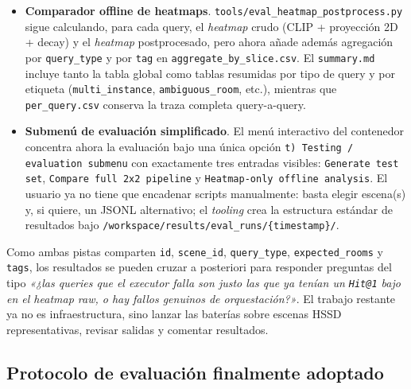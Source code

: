 \documentclass[11pt,a4paper]{article}
\begin{document}
\begin{itemize}
        Early~Stop~Rate, Final~Room~Accuracy, Preview~No~Action~Rate,
        Path~Stopped~Early~Rate, Mean~Executor~Actions y
        Mean~Room~Transitions. Para ello, tanto baseline como executor
        emiten al final de cada query un marcador estructurado
        \texttt{[eval-summary] \{...\}} con historial de habitaciones,
        candidatos intentados/confirmados y rastro de acciones.
  \item \textbf{Comparador offline de heatmaps}.
        \texttt{tools/eval\_heatmap\_postprocess.py} sigue calculando,
        para cada query, el \emph{heatmap} crudo (CLIP + proyección 2D +
        decay) y el \emph{heatmap} postprocesado, pero ahora añade además
        agregación por \texttt{query\_type} y por \texttt{tag} en
        \texttt{aggregate\_by\_slice.csv}. El \texttt{summary.md}
        incluye tanto la tabla global como tablas resumidas por tipo de
        query y por etiqueta (\texttt{multi\_instance},
        \texttt{ambiguous\_room}, etc.), mientras que \texttt{per\_query.csv}
        conserva la traza completa query-a-query.
  \item \textbf{Submenú de evaluación simplificado}.
        El menú interactivo del contenedor concentra ahora la evaluación
        bajo una única opción \texttt{t) Testing / evaluation submenu} con
        exactamente tres entradas visibles:
        \texttt{Generate test set},
        \texttt{Compare full 2x2 pipeline} y
        \texttt{Heatmap-only offline analysis}. El usuario ya no tiene que
        encadenar scripts manualmente: basta elegir escena(s) y, si
        quiere, un JSONL alternativo; el \emph{tooling} crea la estructura
        estándar de resultados bajo
        \texttt{/workspace/results/eval\_runs/\{timestamp\}/}.
\end{itemize}
Como ambas pistas comparten \texttt{id}, \texttt{scene\_id},
\texttt{query\_type}, \texttt{expected\_rooms} y \texttt{tags}, los resultados
se pueden cruzar a posteriori para responder preguntas del tipo \emph{«¿las
queries que el executor falla son justo las que ya tenían un
\texttt{Hit@1} bajo en el heatmap raw, o hay fallos genuinos de
orquestación?»}. El trabajo restante ya no es infraestructura, sino lanzar las
baterías sobre escenas HSSD representativas, revisar salidas y comentar
resultados.

\subsection*{Protocolo de evaluación finalmente adoptado}
\label{sec:eval-protocol}
\end{document}

